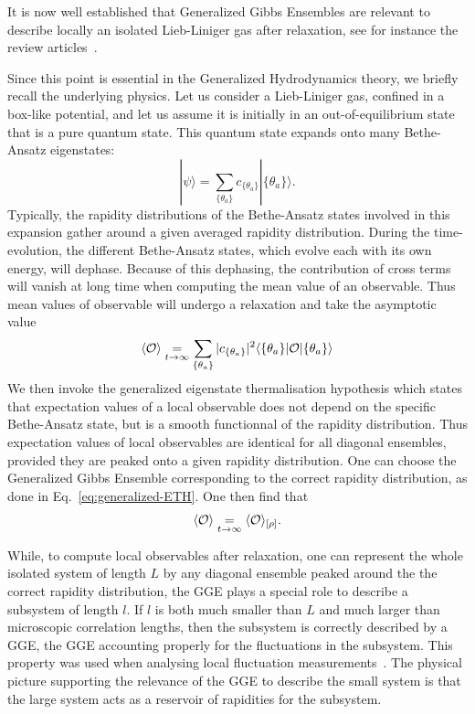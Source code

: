 \documentclass[onecolumn,amsfonts,showpacs,superscriptaddress]{revtex4-1}
\begin{document}
It is now well established that Generalized Gibbs Ensembles are relevant to describe 
locally an isolated Lieb-Liniger gas after relaxation, see for instance the review articles~\citep{vidmar2016generalized,caux2016quench,essler2016quench}.


Since this point is essential in the Generalized Hydrodynamics theory, we briefly recall the underlying physics. 
Let us consider a Lieb-Liniger gas, confined in a box-like potential, and let us assume it is initially in an out-of-equilibrium state that is a pure quantum state. This quantum state expands onto many Bethe-Ansatz eigenstates:
\begin{equation}
    |\psi\rangle = \sum_{\{\theta_a\}} c_{\{\theta_a\}} |\{\theta_a\}\rangle.
\end{equation}
Typically, the rapidity distributions of the Bethe-Ansatz states 
involved in this expansion gather around a given averaged rapidity distribution. During the time-evolution, the different Bethe-Ansatz states, which evolve each with its own energy, will dephase. Because of this dephasing, the contribution of cross terms will vanish at long time when computing the mean value of an observable. Thus mean values of observable will undergo a relaxation and take the asymptotic value
\begin{equation}
\langle {\cal O} \rangle \underset{t\rightarrow \infty} = 
\sum_{\{\theta_a\}} |c_{\{\theta_a\}}|^2 \langle \{\theta_a\}|{\cal O} |\{\theta_a\} \rangle
\end{equation}
 We then invoke the generalized eigenstate thermalisation hypothesis which states that expectation values of a local observable does not depend on the specific Bethe-Ansatz state, but is a smooth functionnal of the rapidity distribution.     
Thus expectation values of local observables are identical for all 
diagonal ensembles, provided they are peaked onto a given rapidity
distribution. One can choose the Generalized Gibbs Ensemble corresponding to the correct rapidity distribution, as done in Eq.~\eqref{eq:generalized-ETH}.  
One then find that 
\begin{equation}
\langle {\cal O} \rangle \underset{t\rightarrow \infty} = 
 \langle {\cal O} \rangle_{[\rho]}.
\end{equation}

While, to compute local observables after relaxation, one can represent the whole isolated system of length $L$ by any diagonal ensemble peaked around the the correct rapidity distribution, the GGE plays a special role to describe a subsystem of length $l$. If $l$ is both much smaller than $L$ and much larger than microscopic correlation lengths, then the subsystem is correctly described by a GGE, the GGE accounting properly for the fluctuations in the subsystem. This property was used when analysing local fluctuation measurements~\citep{armijo_probing_2010,jacqmin_sub-poissonian_2011}. The physical picture supporting the relevance of the GGE to describe the small system is that the large system acts as a reservoir of rapidities for the subsystem. 
\end{document}
